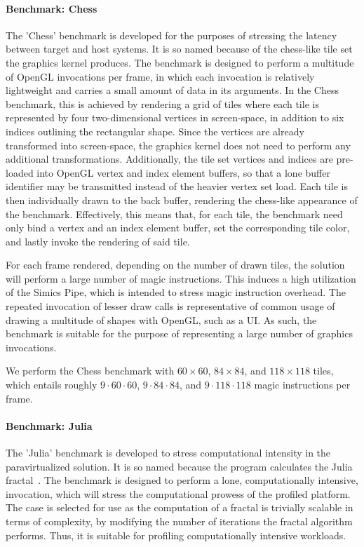\paragraph{Benchmark: Chess}
\label{par:experimentalmethodology_benchmarking_benchmarkchess}
The 'Chess' benchmark is developed for the purposes of stressing the latency between target and host systems.
It is so named because of the chess-like tile set the graphics kernel produces.
The benchmark is designed to perform a multitude of OpenGL invocations per frame, in which each invocation is relatively lightweight and carries a small amount of data in its arguments.
In the Chess benchmark, this is achieved by rendering a grid of tiles where each tile is represented by four two-dimensional vertices in screen-space, in addition to six indices outlining the rectangular shape.
Since the vertices are already transformed into screen-space, the graphics kernel does not need to perform any additional transformations.
Additionally, the tile set vertices and indices are pre-loaded into OpenGL vertex and index element buffers, so that a lone buffer identifier may be transmitted instead of the heavier vertex set load.
Each tile is then individually drawn to the back buffer, rendering the chess-like appearance of the benchmark.
Effectively, this means that, for each tile, the benchmark need only bind a vertex and an index element buffer, set the corresponding tile color, and lastly invoke the rendering of said tile.

For each frame rendered, depending on the number of drawn tiles, the solution will perform a large number of magic instructions.
This induces a high utilization of the Simics Pipe, which is intended to stress magic instruction overhead.
The repeated invocation of lesser draw calls is representative of common usage of drawing a multitude of shapes with OpenGL, such as a UI.
As such, the benchmark is suitable for the purpose of representing a large number of graphics invocations.

We perform the Chess benchmark with $60\times60$, $84\times84$, and $118\times118$ tiles, which entails roughly $9\cdot60\cdot60$, $9\cdot84\cdot84$, and $9\cdot118\cdot118$ magic instructions per frame.

\paragraph{Benchmark: Julia}
\label{par:experimentalmethodology_benchmarking_benchmarkjulia}
The 'Julia' benchmark is developed to stress computational intensity in the paravirtualized solution.
It is so named because the program calculates the Julia fractal~.
The benchmark is designed to perform a lone, computationally intensive, invocation, which will stress the computational prowess of the profiled platform.
The case is selected for use as the computation of a fractal is trivially scalable in terms of complexity, by modifying the number of iterations the fractal algorithm performs.
Thus, it is suitable for profiling computationally intensive workloads.

